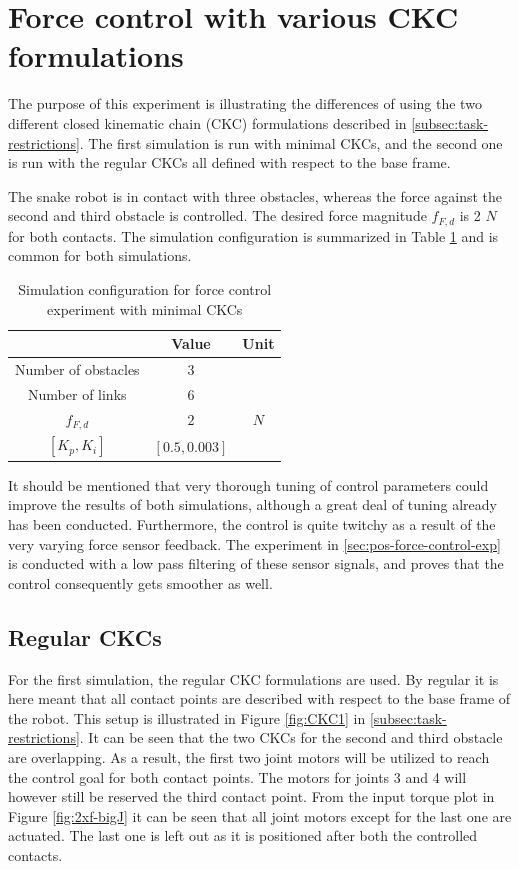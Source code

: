 \section{Force control with various CKC formulations}\label{sec:2xminiJforce}

The purpose of this experiment is illustrating the differences of using the two different closed kinematic chain (CKC) formulations described in \ref{subsec:task-restrictions}. The first simulation is run with minimal CKCs, and the second one is run with the regular CKCs all defined with respect to the base frame.

The snake robot is in contact with three obstacles, whereas the force against the second and third obstacle is controlled. The desired force magnitude $f_{F,d}$ is 2 $N$ for both contacts. The simulation configuration is summarized in Table \ref{tab:exp_2xf} and is common for both simulations.

\begin{table}[]
    \centering
    \begin{tabular}{|c|c|c|}
        \hline
        & Value & Unit\\
        \hline
        Number of obstacles & $3$ & \\
        Number of links & $6$ & \\
        $f_{F,d}$ & $2$ & $N$ \\
        $[K_{p}, K_{i}]$ & $[0.5, 0.003]$ &\\
        \hline
    \end{tabular}
    \caption{Simulation configuration for force control experiment with minimal CKCs}
    \label{tab:exp_2xf}
\end{table}

It should be mentioned that very thorough tuning of control parameters could improve the results of both simulations, although a great deal of tuning already has been conducted. Furthermore, the control is quite twitchy as a result of the very varying force sensor feedback. The experiment in \ref{sec:pos-force-control-exp} is conducted with a low pass filtering of these sensor signals, and proves that the control consequently gets smoother as well.

\subsection{Regular CKCs}

For the first simulation, the regular CKC formulations are used. By regular it is here meant that all contact points are described with respect to the base frame of the robot. This setup is illustrated in Figure \ref{fig:CKC1} in \ref{subsec:task-restrictions}. It can be seen that the two CKCs for the second and third obstacle are overlapping. As a result, the first two joint motors will be utilized to reach the control goal for both contact points. The motors for joints 3 and 4 will however still be reserved the third contact point. From the input torque plot in Figure \ref{fig:2xf-bigJ} it can be seen that all joint motors except for the last one are actuated. The last one is left out as it is positioned after both the controlled contacts. 

